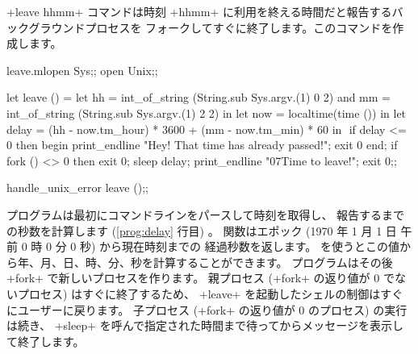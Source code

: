 \ml+leave hhmm+ コマンドは時刻 \ml+hhmm+ に利用を終える時間だと報告するバックグラウンドプロセスを
フォークしてすぐに終了します。このコマンドを作成します。
%
\begin{listingcodefile}[style=numbers]{leave.ml}open Sys;;
open Unix;;

let leave () =
 let hh = int_of_string (String.sub Sys.argv.(1) 0 2)
 and mm = int_of_string (String.sub Sys.argv.(1) 2 2) in
 let now = localtime(time ()) in
 let delay = (hh - now.tm_hour) * 3600 + (mm - now.tm_min) * 60 in
$\label{prog:delay}$
 if delay <= 0 then begin
   print_endline "Hey! That time has already passed!";
   exit 0
 end;
 if fork () <> 0 then exit 0;
 sleep delay;
 print_endline "\007Time to leave!";
 exit 0;;

handle_unix_error leave ();;
\end{listingcodefile}
%
プログラムは最初にコマンドラインをパースして時刻を取得し、
報告するまでの秒数を計算します (\ref{prog:delay} 行目) 。
 関数はエポック (1970 年 1 月 1 日 午前 0 時 0 分 0 秒) から現在時刻までの
経過秒数を返します。  を使うとこの値から年、月、日、時、分、秒を計算することができます。
プログラムはその後 \ml+fork+ で新しいプロセスを作ります。
親プロセス (\ml+fork+ の返り値が 0 でないプロセス) はすぐに終了するため、
\ml+leave+ を起動したシェルの制御はすぐにユーザーに戻ります。
子プロセス (\ml+fork+ の返り値が 0 のプロセス) の実行は続き、
\ml+sleep+ を呼んで指定された時間まで待ってからメッセージを表示して終了します。

